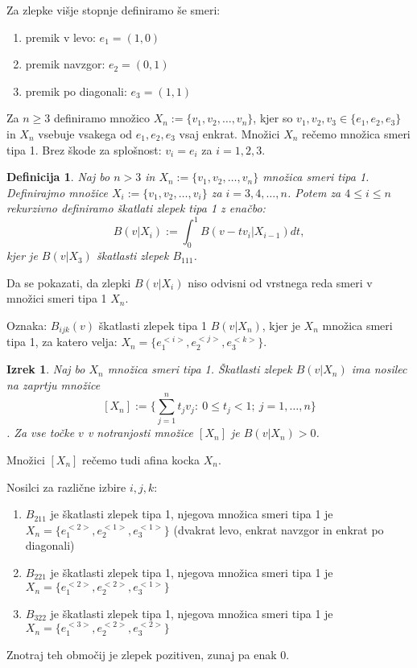 \documentclass[12pt]{article}
\newtheorem{theorem}{Izrek}
\newtheorem{definition}{Definicija}
\begin{document}
Za zlepke višje stopnje definiramo še smeri:
\begin{enumerate}
\item premik v levo: $e_1 = (1,0)$
\item premik navzgor: $e_2 = (0,1)$
\item premik po diagonali: $e_3 = (1,1)$
\end{enumerate}

Za $n \geq 3$ definiramo množico $X_n := \{v_1, v_2, \ldots , v_n\}$, kjer so $v_1, v_2, v_3 \in \{e_1, e_2, e_3\}$ in $X_n$ vsebuje vsakega od $e_1, e_2, e_3$ vsaj enkrat. Množici $X_n$ rečemo množica smeri tipa 1.
Brez škode za splošnost: $v_i = e_i$ za $i = 1, 2, 3$.

\begin{definition}
Naj bo $n > 3$ in $X_n := \{v_1, v_2, \ldots , v_n\}$ množica smeri tipa 1.
Definirajmo množice $X_i := \{v_1, v_2, \ldots , v_i\}$ za $i = 3, 4, \ldots, n$.
Potem za $4 \leq i \leq n$ rekurzivno definiramo škatlati zlepek tipa 1  z enačbo:
$$B(v|X_i) := \int_0^1 B(v-tv_i | X_{i-1}) dt,$$
kjer je $B(v|X_3)$ škatlasti zlepek $B_{111}$.
\end{definition}

Da se pokazati, da zlepki $B(v|X_i)$ niso odvisni od vrstnega reda smeri v množici smeri tipa 1 $X_n$.

Oznaka: $B_{ijk}(v)$ škatlasti zlepek tipa 1 $B(v|X_n)$, kjer je $X_n$ množica smeri tipa 1, za katero velja: $X_n = \{e_1^{<i>},e_2^{<j>}, e_3^{<k>}\}$. %

\begin{theorem}
Naj bo $X_n$ množica smeri tipa 1.
Škatlasti zlepek $B(v|X_n)$ ima nosilec na zaprtju množice
$$[X_n] := \{ \sum_{j=1}^n t_j v_j : \ 0 \leq t_j < 1; \ j = 1, \ldots, n\}$$.
Za vse točke $v$ v notranjosti množice $[X_n]$ je $B(v|X_n) > 0$.
\end{theorem}

Množici $[X_n]$ rečemo tudi afina kocka $X_n$. %

Nosilci za različne izbire $i, j, k$:
\begin{enumerate}
\item $B_{211}$ je škatlasti zlepek tipa 1, njegova množica smeri tipa 1 je  $X_n = \{e_1^{<2>},e_2^{<1>}, e_3^{<1>}\}$ (dvakrat levo, enkrat navzgor in enkrat po diagonali)
\item $B_{221}$ je škatlasti zlepek tipa 1, njegova množica smeri tipa 1 je  $X_n = \{e_1^{<2>},e_2^{<2>}, e_3^{<1>}\}$
\item $B_{322}$ je škatlasti zlepek tipa 1, njegova množica smeri tipa 1 je  $X_n = \{e_1^{<3>},e_2^{<2>}, e_3^{<2>}\}$
\end{enumerate}
Znotraj teh območij je zlepek pozitiven, zunaj pa enak 0.
\\
\\
\end{document}
